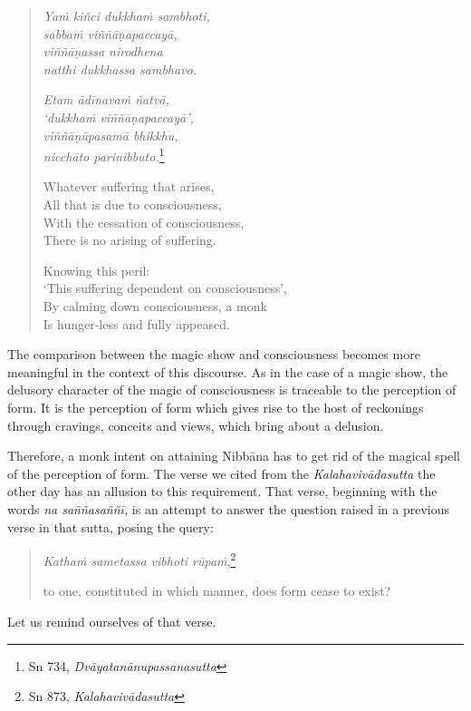 \begin{quote}
\emph{Yaṁ kiñci dukkhaṁ sambhoti,}\\
\emph{sabbaṁ viññāṇapaccayā,}\\
\emph{viññāṇassa nirodhena}\\
\emph{natthi dukkhassa sambhavo.}

\emph{Etam ādīnavaṁ ñatvā,}\\
\emph{`dukkhaṁ viññāṇapaccayā',}\\
\emph{viññāṇūpasamā bhikkhu,}\\
\emph{nicchāto parinibbuto.}\footnote{Sn 734, \emph{Dvāyatanānupassanasutta}}

Whatever suffering that arises,\\
All that is due to consciousness,\\
With the cessation of consciousness,\\
There is no arising of suffering.

Knowing this peril:\\
`This suffering dependent on consciousness',\\
By calming down consciousness, a monk\\
Is hunger-less and fully appeased.
\end{quote}

The comparison between the magic show and consciousness becomes more meaningful in the context of this discourse. As in the case of a magic show, the delusory character of the magic of consciousness is traceable to the perception of form. It is the perception of form which gives rise to the host of reckonings through cravings, conceits and views, which bring about a delusion.

Therefore, a monk intent on attaining Nibbāna has to get rid of the magical spell of the perception of form. The verse we cited from the \emph{Kalahavivādasutta} the other day has an allusion to this requirement. That verse, beginning with the words \emph{na saññasaññī,} is an attempt to answer the question raised in a previous verse in that sutta, posing the query:

\begin{quote}
\emph{Kathaṁ sametassa vibhoti rūpaṁ},\footnote{Sn 873, \emph{Kalahavivādasutta}}

to one, constituted in which manner, does form cease to exist?
\end{quote}

Let us remind ourselves of that verse.

